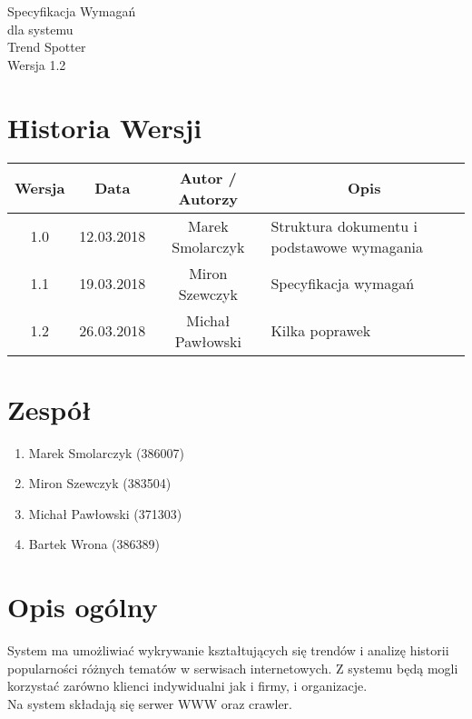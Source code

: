 \documentclass[a4paper]{scrreprt}
\def\version{1.2}
\begin{document}
\thispagestyle{empty}
\begin{flushright}\begin{bfseries}
	\Huge Specyfikacja Wymagań\\
	\vspace{1.5cm}
	\huge dla systemu\\
	\vspace{1.5cm}
	\Huge Trend Spotter\\
	\vfill
	\LARGE Wersja \version\\
\end{bfseries}\end{flushright}

\newpage

\section*{Historia Wersji}

\begin{center}
    \begin{tabular}{|c|c|c|p{6cm}|}
        \hline
	    \textbf{Wersja} & \textbf{Data} & \textbf{Autor / Autorzy} & \multicolumn{1}{|c|}{\textbf{Opis}}\\
        \hline
	    1.0 & 12.03.2018 & Marek Smolarczyk & Struktura dokumentu i podstawowe wymagania\\
        \hline
	    1.1 & 19.03.2018 & Miron Szewczyk & Specyfikacja wymagań\\
	    \hline
	    1.2 & 26.03.2018 & Michał Pawłowski & Kilka poprawek\\
        \hline
    \end{tabular}
\end{center}
\vspace{1cm}

\section*{Zespół}
\begin{enumerate}
	\itemsep-0.1cm
    \item Marek Smolarczyk (386007)
    \item Miron Szewczyk (383504)
    \item Michał Pawłowski (371303)
    \item Bartek Wrona (386389)
\end{enumerate}

\newpage

\section*{Opis ogólny}
System ma umożliwiać wykrywanie kształtujących się trendów i analizę historii popularności różnych tematów w serwisach internetowych. Z systemu będą mogli korzystać zarówno klienci indywidualni jak i firmy, i organizacje.\\
Na system składają się serwer WWW oraz crawler.
\end{document}

